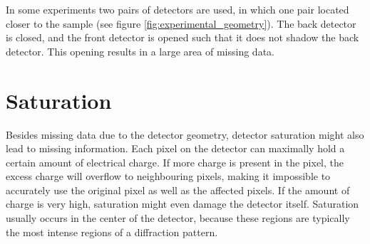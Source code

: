 In some experiments two pairs of detectors are used, in which one pair located closer to the sample (see figure \ref{fig:experimental_geometry}). The back detector is closed, and the front detector is opened such that it does not shadow the back detector. This opening results in a large area of missing data.
 
\section{Saturation}
Besides missing data due to the detector geometry, detector saturation might also lead to missing information. Each pixel on the detector can maximally hold a certain amount of electrical charge. If more charge is present in the pixel, the excess charge will overflow to neighbouring pixels, making it impossible to accurately use the original pixel as well as the affected pixels. If the amount of charge is very high, saturation might even damage the detector itself. Saturation usually occurs in the center of the detector, because these regions are typically the most intense regions of a diffraction pattern. 




